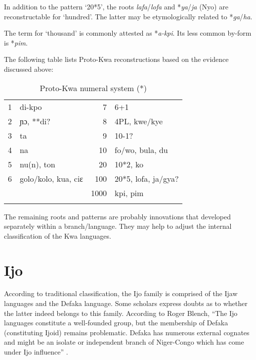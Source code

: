 In addition to the pattern ‘20*5’, the roots \textit{lafa}/\textit{lofa} and *\textit{ya}/\textit{ja} (Nyo) are reconstructable for ‘hundred’. The latter may be etymologically related to *\textit{ga}/\textit{ha}.

The term for ‘thousand’ is commonly attested as *\textit{a-kpi}. Its less common by-form is *\textit{pim}.

The following table lists  Proto-Kwa reconstructions based on the evidence discussed above:

\begin{table}
\caption{\label{tab:3:89}Proto-Kwa numeral system (*)}


\begin{tabularx}{\textwidth}{lXrX}
\lsptoprule

{1} & di-kpo & {7} & 6+1\\
{2} & ɲɔ, **di? & {8} & 4PL, kwe/kye\\
{3} & ta & {9} & 10-1?\\
{4} & na & {10} & fo/wo, bula, du\\
{5} & nu(n), ton & {20} & 10*2, ko\\
{6} & golo/kolo, kua, ciɛ & {100} & 20*5, lofa, ja/gya?\\
&  & {1000} & kpi, pim\\
\lspbottomrule
\end{tabularx}
The remaining roots and patterns are probably innovations that developed separately within a branch/language. They may help to adjust the internal classification of the Kwa languages. 
\end{table}

\clearpage 

\section{Ijo}%

According to traditional classification, the Ijo family is comprised of the Ijaw languages and the Defaka language. Some scholars express doubts as to whether the latter indeed belongs to this family. According to Roger Blench, ``The Ijo languages constitute a well-founded group, but the membership of Defaka (constituting Ijoid) remains problematic. Defaka has numerous external cognates and might be an isolate or independent branch of Niger-Congo which has come under Ijo influence''  \citep{Blench1993NigerCongo}. 

